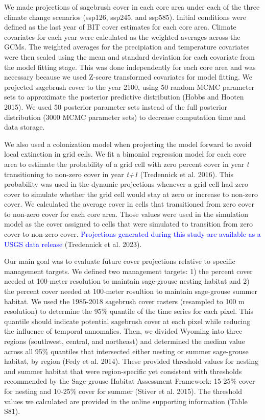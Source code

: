 \documentclass[
  12pt,
]{article}
\begin{document}
We made projections of sagebrush cover in each core area under each of the three climate change scenarios (ssp126, ssp245, and ssp585).
Initial conditions were defined as the last year of BIT cover estimates for each core area.
Climate covariates for each year were calculated as the weighted averages across the GCMs.
The weighted averages for the precipiation and temperature covariates were then scaled using the mean and standard deviation for each covariate from the model fitting stage.
This was done independently for each core area and was necessary because we used Z-score transformed covariates for model fitting.
We projected sagebrush cover to the year 2100, using 50 random MCMC parameter sets to approximate the posterior predictive distribution (Hobbs and Hooten 2015).
We used 50 posterior parameter sets instead of the full posterior distribution (3000 MCMC parameter sets) to decrease computation time and data storage.

We also used a colonization model when projecting the model forward to avoid local extinction in grid cells.
We fit a bimonial regression model for each core area to estimate the probability of a grid cell with zero percent cover in year \emph{t} transitioning to non-zero cover in year \emph{t+1} (Tredennick et al. 2016).
This probability was used in the dynamic projections whenever a grid cell had zero cover to simulate whether the grid cell would stay at zero or increase to non-zero cover.
We calculated the average cover in cells that transitioned from zero cover to non-zero cover for each core area.
Those values were used in the simulation model as the cover assigned to cells that were simulated to transition from zero cover to non-zero cover.
\textcolor{blue}{Projections generated during this study are available as a USGS data release} (Tredennick et al. 2023).

Our main goal was to evaluate future cover projections relative to specific management targets.
We defined two management targets: 1) the percent cover needed at 100-meter resolution to maintain sage-grouse nesting habitat and 2) the percent cover needed at 100-meter rosultion to maintain sage-grouse summer habitat.
We used the 1985-2018 sagebrush cover rasters (resampled to 100 m resolution) to determine the 95\% quantile of the time series for each pixel.
This quantile should indicate potential sagebrush cover at each pixel while reducing the influence of temporal annomalies.
Then, we divided Wyoming into three regions (southwest, central, and northeast) and determined the median value across all 95\% quantiles that intersected either nesting or summer sage-grouse habitat, by region (Fedy et al. 2014).
These provided threshold values for nesting and summer habitat that were region-specific yet consistent with thresholds recommended by the Sage-grouse Habitat Assessment Framework: 15-25\% cover for nesting and 10-25\% cover for summer (Stiver et al. 2015).
The threshold values we calculated are provided in the online supporting information (Table S81).
\end{document}
